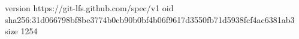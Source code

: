 version https://git-lfs.github.com/spec/v1
oid sha256:31d066798bf8be3774b0cb90b0bf4b06f9617d3550fb71d5938fcf4ac6381ab3
size 1254
